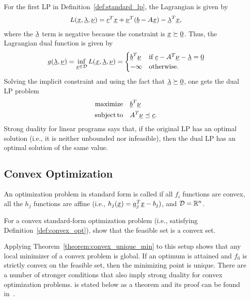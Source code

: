 \begin{example}
For the first LP in Definition~\ref{def:standard_lp}, the Lagrangian is given by
	\[ L(\underline{x},\underline{\lambda},\underline{\nu}) = \underline{c}^T \underline{x} + \underline{\nu}^T (\underline{b} - A\underline{x}) - \underline{\lambda}^T \underline{x}, \]
	where the $\underline{\lambda}$ term is negative because the constraint is $\underline{x} \succeq \underline{0}$.
Thus, the Lagrangian dual function is given by
\begin{equation*}
g(\underline{\lambda},\underline{\nu})
= \inf_{\underline{x}\in \mathcal{D}} L(\underline{x},\underline{\lambda},\underline{\nu})
	= \begin{cases} \underline{b}^T \underline{\nu} & \text{if } \underline{c} - A^T \underline{\nu} - \underline{\lambda} = \underline{0} \\
-\infty & \text{otherwise}. \end{cases}
\end{equation*}
Solving the implicit constraint and using the fact that $\underline{\lambda} \succeq \underline{0}$, one gets the dual LP problem
\begin{align*}
\mathrm{maximize} \quad & \underline{b}^T \underline{\nu} \\
	\mathrm{subject\,to} \quad & A^T \underline{\nu} \preceq \underline{c}.
\end{align*}
Strong duality for linear programs says that, if the original LP has an optimal solution (i.e., it is neither unbounded nor infeasible), then the dual LP has an optimal solution of the same value.
\end{example}

\subsection{Convex Optimization}

\begin{definition} \label{def:convex_opt}
An optimization problem in standard form is called  if all $f_i$ functions are convex, all the $h_j$ functions are affine (i.e., $h_j(\underline{x}) = \underline{a}_j^T \underline{x} - b_j)$, and $\mathcal{D}=\mathbb{R}^n$. 
\end{definition}

\begin{problem}
For a convex standard-form optimization problem (i.e.,  satisfying Definition~\ref{def:convex_opt}), show that the feasible set is a convex set.
\end{problem}

Applying Theorem~\ref{theorem:convex_unique_min} to this setup shows that any local minimizer of a convex problem is global.  If an optimum is attained and $f_0$ is strictly convex on the feasible set, then the minimizing point is unique.
There are a number of stronger conditions that also imply strong duality for convex optimization problems.
 is stated below as a theorem and its proof can be found in~\cite[Sec.~5.3.2]{Boyd-2004}.
 
